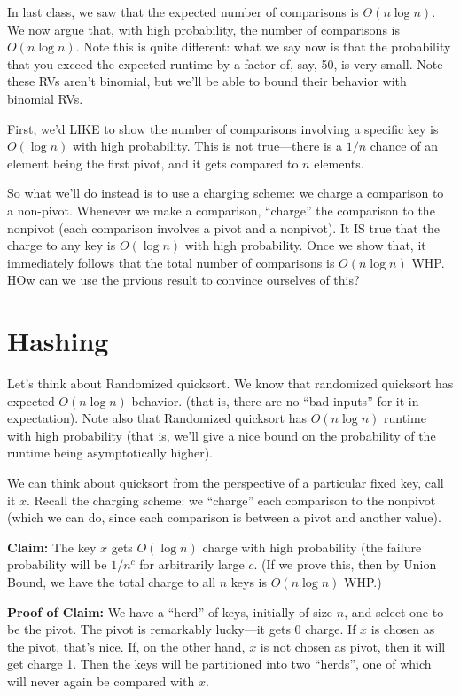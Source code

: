 \documentclass{article}
\begin{document}
In last class, we saw that the expected number of comparisons is $\Theta(n\log n)$.
We now argue that, with high probability, the number of comparisons is $O(n\log n)$.
Note this is quite different: what we say now is that the probability that you 
exceed the expected runtime by a factor of, say, 50, is very small.
Note these RVs aren't binomial, but we'll be able to bound their behavior
with binomial RVs.

First, we'd LIKE to show the number of comparisons involving a specific key is $O(\log n)$ with 
high probability.
This is not true---there is a $1/n$ chance of an element being the first
pivot, and it gets compared to $n$ elements.

So what we'll do instead is to use a charging scheme: we charge
a comparison to a non-pivot.
Whenever we make a comparison, ``charge'' the comparison to the nonpivot (each comparison involves a pivot and a nonpivot).
It IS true that the charge to any key is $O(\log n)$ with high probability.
Once we show that, it immediately follows that the total number of comparisons is $O(n\log n)$ WHP.
HOw can we use the prvious result to convince ourselves of this?



\section{Hashing}

Let's think about Randomized quicksort.
We know that randomized quicksort has expected $O(n\log n)$ behavior.
(that is, there are no ``bad inputs'' for it in expectation).
Note also that Randomized quicksort has $O(n\log n)$ runtime with high
probability (that is, we'll give a nice bound on the probability of 
the runtime being asymptotically higher).


We can think about quicksort from the perspective of a particular fixed
key, call it $x$.
Recall the charging scheme: we ``charge'' each comparison to the nonpivot 
(which we can do, since each comparison is between a pivot and another value).

\textbf{Claim:}
The key $x$ gets $O(\log n)$ charge with high probability (the failure
probability will be $1/n^c$ for arbitrarily large $c$.
(If we prove this, then by Union Bound, we have the total charge to all
$n$ keys is $O(n\log n)$ WHP.)

\textbf{Proof of Claim:}
We have a ``herd'' of keys, initially of size $n$, and select one to be the pivot.
The pivot is remarkably lucky---it gets 0 charge.
If $x$ is chosen as the pivot, that's nice.
If, on the other hand, $x$ is not chosen as pivot, then it will get charge 1.
Then the keys will be partitioned into two ``herds'', one of which will
never again be compared with $x$.
\end{document}

